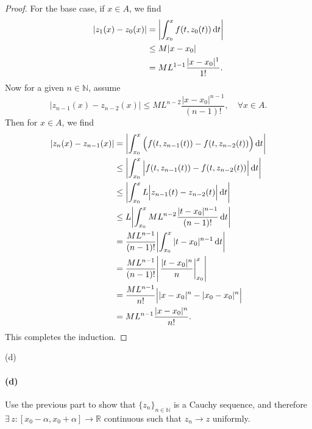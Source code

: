 \documentclass[12pt]{article}
\newenvironment{fullbox}{\begin{lrbox}{\savefullbox}\begin{minipage}{\dimexpr\textwidth-2\fboxsep\relax}}{\end{minipage}\end{lrbox}\begin{center}\framebox[\textwidth]{\usebox{\savefullbox}}\end{center}}
\newenvironment{pbox}[1][]{\begin{fullbox}\ifx#1\empty\else\paragraph{#1}\fi}{\end{fullbox}}
\theoremstyle{definition}
\newcommand{\N}{\mathbb{N}}
\newcommand{\R}{\mathbb{R}}
\begin{document}
\begin{proof}
    For the base case, if $x \in A$, we find
    \begin{align*}
        |z_1(x) - z_0(x)|
            &= \abs{\int_{x_0}^{x} f(t, z_0(t)) \dd{t}} \\
            &\leq M|x - x_0| \\
            &= ML^{1-1} \frac{|x - x_0|^1}{1!}.
    \end{align*}
    Now for a given $n \in \N$, assume
    \[
        |z_{n-1}(x) - z_{n-2}(x)| \leq ML^{n-2}\frac{|x - x_0|^{n-1}}{(n-1)!}, \quad \forall x \in A.
    \]
    Then for $x \in A$, we find
    \begin{align*}
        \abs{z_n(x) - z_{n-1}(x)}
            &= \abs{\int_{x_0}^{x} \qty\Big(f(t, z_{n-1}(t)) - f(t, z_{n-2}(t))) \dd{t}} \\
            &\leq \abs{\int_{x_0}^{x} \abs\Big{f(t, z_{n-1}(t)) - f(t, z_{n-2}(t))} \dd{t}} \\
            &\leq \abs{\int_{x_0}^{x} L \abs\Big{z_{n-1}(t) - z_{n-2}(t)} \dd{t}} \\
            &\leq L \abs{\int_{x_0}^{x} ML^{n-2} \frac{|t - x _0|^{n-1}}{(n-1)!} \dd{t}} \\
            &= \frac{ML^{n-1}}{(n-1)!} \abs{\int_{x_0}^{x} |t - x _0|^{n-1} \dd{t}} \\
            &= \frac{ML^{n-1}}{(n-1)!} \abs{\eval{\frac{|t - x _0|^n}{n}}_{x_0}^{x}} \\
            &= \frac{ML^{n-1}}{n!} \abs\Big{|x - x_0|^n - |x_0 - x_0|^n} \\
            &= ML^{n-1}\frac{|x - x_0|^n}{n!}.
    \end{align*}
    This completes the induction.
    
\end{proof}





\newpage
\begin{pbox}[(d)]
    Use the previous part to show that $\{z_n\}_{n\in\N}$ is a Cauchy sequence, and therefore $\exists\, z:[x_0-\alpha,x_0+\alpha]\to \R$ continuous such that $z_n \to z$ uniformly.
\end{pbox}
\end{document}
